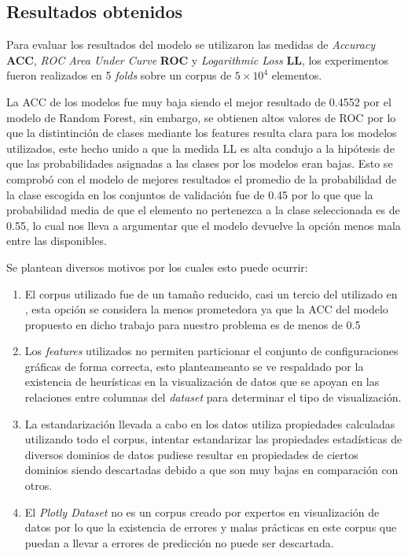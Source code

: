 \documentclass[a4paper,10pt,twocolumn]{article}
\begin{document}
	\subsection{Resultados obtenidos}

	Para evaluar los resultados del modelo se utilizaron las medidas de \textit{Accuracy} \textbf{ACC},
	\textit{ROC Area Under Curve} \textbf{ROC} y \textit{Logarithmic Loss} \textbf{LL}, los experimentos
	fueron realizados en  5 \textit{folds} sobre un corpus de $5 \times 10^4$ elementos.
	
	La ACC de los modelos fue muy baja siendo el mejor resultado de 0.4552 por el modelo de Random Forest, 
	sin embargo, se obtienen altos valores de ROC por lo que la distintinci\'on de clases mediante los features
	resulta clara para los modelos utilizados, este hecho unido a que la medida LL es alta condujo a la hip\'otesis 
	de que las probabilidades asignadas a las clases por los modelos eran bajas.
	Esto se comprob\'o con el modelo de mejores resultados el promedio de la probabilidad de la clase escogida en los conjuntos de 
	validaci\'on fue de 0.45 por lo que que la probabilidad media de que el elemento no pertenezca a la clase seleccionada
	es de 0.55, lo cual nos lleva a argumentar que el modelo devuelve la opci\'on menos mala entre las disponibles.
	
	Se plantean diversos motivos por los cuales esto puede ocurrir:

	\begin{enumerate}
		\item El corpus utilizado fue de un tamaño reducido, casi un tercio del utilizado en \cite{hu2019vizml}, esta opci\'on se considera
		la menos prometedora ya que la ACC del modelo propuesto en dicho trabajo para nuestro problema es de menos de 0.5
		\item Los \textit{features} utilizados no permiten particionar el conjunto de configuraciones gr\'aficas de forma correcta, esto planteameanto
		se ve respaldado por la existencia de heur\'isticas en la visualizaci\'on de datos que se apoyan en las relaciones entre columnas del \textit{dataset}
		para determinar el tipo de visualizaci\'on.
		\item La estandarizaci\'on llevada a cabo en los datos utiliza propiedades calculadas utilizando todo el corpus, intentar estandarizar las propiedades
		estad\'isticas de diversos dominios de datos pudiese resultar en propiedades de ciertos dominios siendo descartadas debido a que son muy bajas en comparaci\'on con otros.
		\item El \textit{Plotly Dataset} no es un corpus creado por expertos en visualizaci\'on de datos por lo que la existencia de errores y malas pr\'acticas en este corpus que 
		puedan a llevar a errores de predicci\'on no puede ser descartada.
	\end{enumerate}
\end{document}
